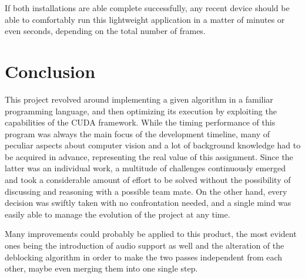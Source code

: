 \documentclass{article}
\begin{document}
If both installations are able complete successfully, any recent device should be able to comfortably run this lightweight application in a matter of minutes or even seconds, depending on the total number of frames.

\section{Conclusion}
This project revolved around implementing a given algorithm in a familiar programming language, and then optimizing its execution by exploiting the capabilities of the CUDA framework. While the timing performance of this program was always the main focus of the development timeline, many of peculiar aspects about computer vision and a lot of background knowledge had to be acquired in advance, representing the real value of this assignment. Since the latter was an individual work, a multitude of challenges continuously emerged and took a considerable amount of effort to be solved without the possibility of discussing and reasoning with a possible team mate. On the other hand, every decision was swiftly taken with no confrontation needed, and a single mind was easily able to manage the evolution of the project at any time.

Many improvements could probably be applied to this product, the most evident ones being the introduction of audio support as well and the alteration of the deblocking algorithm in order to make the two passes independent from each other, maybe even merging them into one single step.
\end{document}
